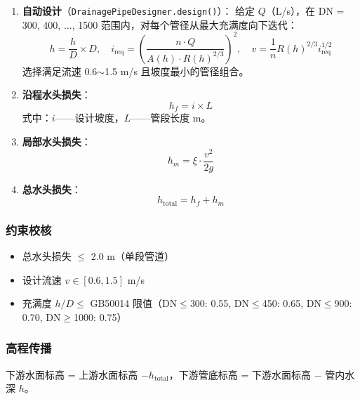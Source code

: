 \documentclass[12pt,a4paper]{ctexart}
\begin{document}
\begin{enumerate}[label=(\arabic*), leftmargin=*]
    \item \textbf{自动设计}（\texttt{DrainagePipeDesigner.design()}）：
    给定 $Q$（L/s），在 DN = 300, 400, $\dots$, 1500 范围内，对每个管径从最大充满度向下迭代：
    \begin{equation}
        h = \frac{h}{D} \times D, \quad
        i_{\text{req}} = \left(\frac{n \cdot Q}{A(h) \cdot R(h)^{2/3}}\right)^2, \quad
        v = \frac{1}{n} R(h)^{2/3} i_{\text{req}}^{1/2}
    \end{equation}
    选择满足流速 0.6$\sim$1.5 m/s 且坡度最小的管径组合。

    \item \textbf{沿程水头损失}：
    \begin{equation}
        h_f = i \times L
    \end{equation}
    式中：$i$——设计坡度，$L$——管段长度 m。

    \item \textbf{局部水头损失}：
    \begin{equation}
        h_m = \xi \cdot \frac{v^2}{2g}
    \end{equation}

    \item \textbf{总水头损失}：
    \begin{equation}
        h_{\text{total}} = h_f + h_m
    \end{equation}
\end{enumerate}

\subsubsection{约束校核}
\begin{itemize}[itemsep=0pt]
    \item 总水头损失 $\leq$ 2.0 m（单段管道）
    \item 设计流速 $v \in [0.6, 1.5]$ m/s
    \item 充满度 $h/D \leq$ GB50014 限值（DN$\leq$300: 0.55, DN$\leq$450: 0.65, DN$\leq$900: 0.70, DN$\geq$1000: 0.75）
\end{itemize}

\subsubsection{高程传播}

下游水面标高 = 上游水面标高 $- h_{\text{total}}$，下游管底标高 = 下游水面标高 $-$ 管内水深 $h$。
\end{document}
